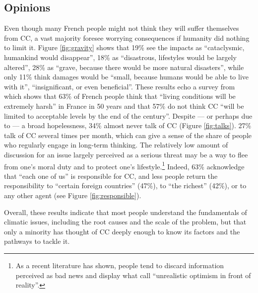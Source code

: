 \documentclass[english,5p,authoryear]{elsarticle}
\begin{document}
    \subsection{Opinions\label{subsec:opinions}}
Even though many French people might not think they will suffer themselves from CC, a vast majority foresee worrying consequences if humanity did nothing to limit it. Figure \ref{fig:gravity} shows that 19\% see the impacts as ``cataclysmic, humankind would disappear'', 18\% as ``disastrous, lifestyles would be largely altered'', 28\% as ``grave, because there would be more natural disasters'', while only 11\% think damages would be ``small, because humans would be able to live with it'', ``insignificant, or even beneficial''. These results echo a survey from \citet{ademe_representations_2018} which shows that 63\% of French people think that ``living conditions will be extremely harsh'' in France in 50 years and that 57\% do not think CC ``will be limited to acceptable levels by the end of the century''. Despite --- or perhaps due to --- a broad hopelessness, 34\% almost never talk of CC (Figure \ref{fig:talks}). 27\% talk of CC several times per month, which can give a sense of the share of people who regularly engage in long-term thinking. The relatively low amount of discussion for an issue largely perceived as a serious threat may be a way to flee from one's moral duty and to protect one's lifestyle.\footnote{As a recent literature has shown, people tend to discard information perceived as bad news and display what \citet{sharot_et_al_2011} call ``unrealistic optimism in front of reality''.} Indeed, 63\% acknowledge that ``each one of us'' is responsible for CC, and less people return the responsibility to ``certain foreign countries'' (47\%), to ``the richest'' (42\%), or to any other agent (see Figure \ref{fig:responsible}).



Overall, these results indicate that most people understand the fundamentals of climatic issues, including the root causes and the scale of the problem, but that only a minority has thought of CC deeply enough to know its factors and the pathways to tackle it.
\end{document}
